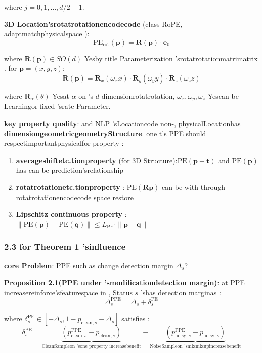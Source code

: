 \documentclass[
  12pt,
]{article}
\providecommand{\tightlist}{%
  \setlength{\itemsep}{0pt}\setlength{\parskip}{0pt}}
\begin{document}
where \(j = 0, 1, \ldots, d/2 - 1\). 

\textbf{3D Location'srotatrotationencodecode }(class  RoPE, adaptmatchphysicalspace ):
\[\text{PE}_{\text{rot}}(\mathbf{p}) = \mathbf{R}(\mathbf{p}) \cdot \mathbf{e}_0\]

where \(\mathbf{R}(\mathbf{p}) \in SO(d)\) Yesby title Parameterization 'srotatrotationmatrimatrix . for 
\(\mathbf{p} = (x, y, z)\): 
\[\mathbf{R}(\mathbf{p}) = \mathbf{R}_x(\omega_x x) \cdot \mathbf{R}_y(\omega_y y) \cdot \mathbf{R}_z(\omega_z z)\]

where \(\mathbf{R}_\alpha(\theta)\) Yesat  \(\alpha\) on 's \(d\)
dimensionrotatrotation, \(\omega_x, \omega_y, \omega_z\) Yescan be Learningor fixed 'srate Parameter. 

\textbf{key property quality}: and  NLP
'sLocationcode non-, physicalLocationhas \textbf{dimensiongeometricgeometryStructure}. one t's PPE
should respectimportantphysicalfor property : 

\begin{enumerate}
\def\labelenumi{\arabic{enumi}.}
\tightlist
\item
  \textbf{averageshiftetc.tionproperty }(for  3D
  Structure):\(\text{PE}(\mathbf{p} + \mathbf{t})\) and 
  \(\text{PE}(\mathbf{p})\) has can be prediction'srelationship 
\item
  \textbf{rotatrotationetc.tionproperty }: \(\text{PE}(\mathbf{R}\mathbf{p})\)
  can be with through rotatrotationencodecode space restore 
\item
  \textbf{Lipschitz
  continuous property }: \(\|\text{PE}(\mathbf{p}) - \text{PE}(\mathbf{q})\| \leq L_{\text{PE}} \cdot \|\mathbf{p} - \mathbf{q}\|\)
\end{enumerate}

\subsubsection{2.3 for  Theorem 1
'sinfluence }\label{ux5bf9-theorem-1-ux7684ux5f71ux54cd}

\textbf{core Problem}: PPE such as change detection margin \(\Delta_s\)?

\textbf{Proposition 2.1(PPE under 'smodificationdetection margin)}:  at  PPE
increasereinforce'sfeaturespace in , Status \(s\) 'shas detection marginas : 
\[\boxed{\Delta_s^{\text{PPE}} = \Delta_s + \delta_s^{\text{PE}}}\]

where
\(\delta_s^{\text{PE}} \in [-\Delta_s, 1 - p_{\text{clean},s} - \Delta_s]\)
satisfies : 
\[\delta_s^{\text{PE}} = \underbrace{(p_{\text{clean},s}^{\text{PPE}} - p_{\text{clean},s})}_{\text{CleanSampleon 'sone property increasebenefit}} - \underbrace{(p_{\text{noisy},s}^{\text{PPE}} - p_{\text{noisy},s})}_{\text{NoiseSampleon 'smixmixupincreasebenefit}}\]
\end{document}

